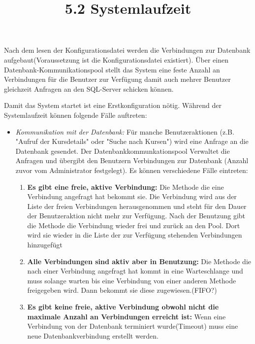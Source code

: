 		Nach dem lesen der Konfigurationsdatei werden die Verbindungen zur Datenbank aufgebaut(Voraussetzung ist die Konfigurationsdatei existiert). Über einen Datenbank-Kommunikationspool stellt das System eine feste Anzahl an Verbindungen für die Benutzer zur Verfügung damit auch mehrer Benutzer gleichzeit Anfragen an den SQL-Server schicken können. 
	\title{5.2 Systemlaufzeit}
		Damit das System startet ist eine Erstkonfiguration nötig. Während der Systemlaufzeit können folgende Fälle auftreten:
		\begin{itemize}
			\item \emph{Kommunikation mit der Datenbank:} Für manche Benutzeraktionen (z.B. "Aufruf der Kursdetails" oder "Suche nach Kursen") wird eine Anfrage an die Datenbank gesendet. Der Datenbankkommunkationspool Verwaltet die Anfragen und übergibt den Benutzern Verbindungen zur Datenbank (Anzahl zuvor vom Administrator festgelegt). Es können verschiedene Fälle eintreten:
			\begin{enumerate}
				\item \textbf{Es gibt eine freie, aktive Verbindung:} 
				Die Methode die eine Verbindung angefragt hat bekommt sie. Die Verbindung wird aus der Liste der freien Verbindungen herausgenommen und steht für den Dauer der Benutzeraktion nicht mehr zur Verfügung. Nach der Benutzung gibt die Methode die Verbindung wieder frei und zurück an den Pool. Dort wird sie wieder in die Liste der zur Verfügung stehenden Verbindungen hinzugefügt
				\item \textbf{Alle Verbindungen sind aktiv aber in Benutzung:} 
				Die Methode die nach einer Verbindung angefragt hat kommt in eine Warteschlange und muss solange warten bis eine Verbindung von einer anderen Methode freigegeben wird. Dann bekommt sie diese zugewiesen.(FIFO?)
				\item \textbf{Es gibt keine freie, aktive Verbindung obwohl nicht die maximale Anzahl an Verbindungen erreicht ist:}
				 Wenn eine Verbindung von der Datenbank terminiert wurde(Timeout) muss eine neue Datenbankverbindung erstellt werden.
				

\end{enumerate}
\end{itemize}
